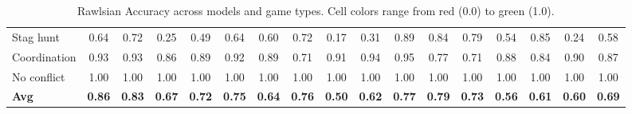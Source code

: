 \begin{table}[htbp]
\begin{adjustbox}{max width=\textwidth}
\begin{tabular}{lccccccccccccccc|c}
Stag hunt & \cellcolor[HTML]{BFE2A0}0.64 & \cellcolor[HTML]{99D18D}0.72 & \cellcolor[HTML]{EA9672}0.25 & \cellcolor[HTML]{FEFBBC}0.49 & \cellcolor[HTML]{BCE19E}0.64 & \cellcolor[HTML]{D0EAA8}0.60 & \cellcolor[HTML]{98D08D}0.72 & \cellcolor[HTML]{E4775B}0.17 & \cellcolor[HTML]{EFAF84}0.31 & \cellcolor[HTML]{4CAE68}0.89 & \cellcolor[HTML]{65B974}0.84 & \cellcolor[HTML]{7AC37E}0.79 & \cellcolor[HTML]{EEF7B7}0.54 & \cellcolor[HTML]{5DB670}0.85 & \cellcolor[HTML]{E9926F}0.24 & \cellcolor[HTML]{DAEEAD}0.58 \\
Coordination & \cellcolor[HTML]{39A65F}0.93 & \cellcolor[HTML]{38A55E}0.93 & \cellcolor[HTML]{5BB56F}0.86 & \cellcolor[HTML]{4DAE68}0.89 & \cellcolor[HTML]{3CA760}0.92 & \cellcolor[HTML]{4DAF68}0.89 & \cellcolor[HTML]{A0D491}0.71 & \cellcolor[HTML]{43AA64}0.91 & \cellcolor[HTML]{37A55E}0.94 & \cellcolor[HTML]{30A25A}0.95 & \cellcolor[HTML]{82C682}0.77 & \cellcolor[HTML]{9FD390}0.71 & \cellcolor[HTML]{50B06A}0.88 & \cellcolor[HTML]{64B974}0.84 & \cellcolor[HTML]{49AD67}0.90 & \cellcolor[HTML]{56B36D}0.87 \\
No conflict & \cellcolor[HTML]{1A9850}1.00 & \cellcolor[HTML]{1A9850}1.00 & \cellcolor[HTML]{1A9850}1.00 & \cellcolor[HTML]{1A9850}1.00 & \cellcolor[HTML]{1A9850}1.00 & \cellcolor[HTML]{1A9850}1.00 & \cellcolor[HTML]{1A9850}1.00 & \cellcolor[HTML]{1A9850}1.00 & \cellcolor[HTML]{1A9850}1.00 & \cellcolor[HTML]{1A9850}1.00 & \cellcolor[HTML]{1A9850}1.00 & \cellcolor[HTML]{1A9850}1.00 & \cellcolor[HTML]{1A9850}1.00 & \cellcolor[HTML]{1A9850}1.00 & \cellcolor[HTML]{1A9850}1.00 & \cellcolor[HTML]{1A9850}1.00 \\
\midrule
\textbf{Avg} & \cellcolor[HTML]{5BB56F}\textbf{0.86} & \cellcolor[HTML]{69BB76}\textbf{0.83} & \cellcolor[HTML]{B1DC99}\textbf{0.67} & \cellcolor[HTML]{99D18D}\textbf{0.72} & \cellcolor[HTML]{8DCB87}\textbf{0.75} & \cellcolor[HTML]{C1E3A0}\textbf{0.64} & \cellcolor[HTML]{87C984}\textbf{0.76} & \cellcolor[HTML]{FDFEBE}\textbf{0.50} & \cellcolor[HTML]{C9E7A5}\textbf{0.62} & \cellcolor[HTML]{83C783}\textbf{0.77} & \cellcolor[HTML]{7AC37E}\textbf{0.79} & \cellcolor[HTML]{94CF8B}\textbf{0.73} & \cellcolor[HTML]{E4F2B1}\textbf{0.56} & \cellcolor[HTML]{CBE7A6}\textbf{0.61} & \cellcolor[HTML]{D0E9A8}\textbf{0.60} & \cellcolor[HTML]{A6D794}\textbf{0.69} \\
\bottomrule
\end{tabular}
\end{adjustbox}
\caption{Rawlsian Accuracy across models and game types. 
Cell colors range from \textcolor[HTML]{D73027}{red} (0.0) to \textcolor[HTML]{1A9850}{green} (1.0).}
\label{tab:accuracy_heatmap}
\end{table}